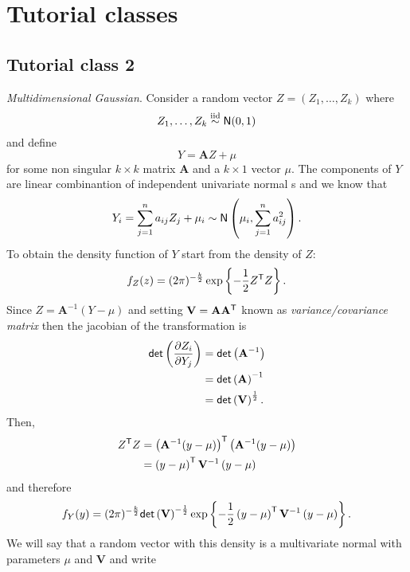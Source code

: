 \chapter{Tutorial classes}
\section{Tutorial class 2}
\begin{revise}
	\emph{Multidimensional Gaussian}. Consider a random vector $Z=(Z_{1},\ldots,Z_{k})$ where 
	\begin{equation*}
		Z_{1},\ldots,Z_{k}\stackrel{\mathrm{iid}}{\sim}\mathsf{N}(0,1)
	\end{equation*}
	and define 
	\begin{equation*}
		Y=\mathbf{A}Z+\mu
	\end{equation*}
	for some non singular $k\times k$ matrix $\mathbf{A}$ and a $k\times 1$ vector $\mu$. The components of $Y$ are linear combinantion of independent univariate normal \rv s and we know that
	\begin{equation*}
		Y_{i}=\sum_{j=1}^{n}a_{ij}Z_{j}+\mu_{i}\sim\mathsf{N}\left(\mu_{i},\sum_{j=1}^{n}a_{ij}^{2}\right).
	\end{equation*}
	To obtain the density function of $Y$ start from the density of $Z$:
	\begin{equation*}
		f_{Z}(z)=(2\pi)^{-\frac{k}{2}}\exp\left\{-\frac{1}{2}Z^{\mathsf{T}}Z\right\}.
	\end{equation*}
	Since $Z=\mathbf{A}^{-1}(Y-\mu)$ and setting $\mathbf{V}=\mathbf{AA^{\mathsf{T}}}$ known as \textit{variance/covariance matrix} then the jacobian of the transformation is
	\begin{align*}
		\mathsf{det}\left(\frac{\partial Z_{i}}{\partial Y_{j}}\right)&=\mathsf{det}\left(\mathbf{A}^{-1}\right)\\
		&=\mathsf{det}\left(\mathbf{A}\right)^{-1}\\
		&=\mathsf{det}\left(\mathbf{V}\right)^{\frac{1}{2}}.
	\end{align*}
	Then,
	\begin{align*}
		Z^{\mathsf{T}}Z&=\left(\mathbf{A}^{-1}(y-\mu)\right)^{\mathsf{T}}\left(\mathbf{A}^{-1}(y-\mu)\right)\\
		&=\left(y-\mu\right)^{\mathsf{T}}\mathbf{V}^{-1}\left(y-\mu\right)
	\end{align*}
	and therefore
	\begin{equation*}
		f_{Y}(y)=(2\pi)^{-\frac{k}{2}}\mathsf{det}\left(\mathbf{V}\right)^{-\frac{1}{2}}\exp\left\{-\frac{1}{2}\left(y-\mu\right)^{\mathsf{T}}\mathbf{V}^{-1}\left(y-\mu\right)\right\}.
	\end{equation*}
	We will say that a random vector with this density is a multivariate normal with parameters $\mu$ and $\mathbf{V}$ and write

\end{revise}
